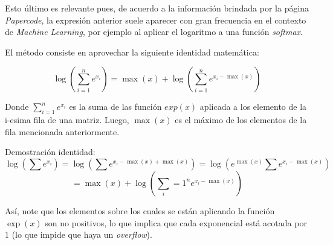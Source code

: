 \documentclass[12pt, letterpaper]{article}
\begin{document}
Esto último es relevante pues, de acuerdo a la información brindada por la página \textit{Papercode}, la expresión anterior
suele aparecer con gran frecuencia en el contexto de \textit{Machine Learning}, por ejemplo al aplicar el logaritmo a una función \textit{softmax}. 

El método consiste en aprovechar la siguiente identidad matemática: 

$$\log\left( \sum_{i=1}^n e^{x_i} \right) = \max(x) + \log\left( \sum_{i=1}^n e^{x_i-\max(x)} \right)$$

Donde $\sum_{i=1}^n e^{x_i}$ es la suma de las función $exp(x)$ aplicada a los elemento de la i-esima fila de una matriz. Luego, $\max(x)$ es el máximo de los elementos de la fila mencionada anteriormente.

Demostración identidad:
\[
\log\left( \sum e^{x_i} \right)=\log\left( \sum e^{x_i-\max(x)+\max(x)} \right)=\log\left( e^{\max(x)} \sum e^{x_i-\max(x)} \right)
\]
\[
=\max(x) + \log\left( \sum_i=1^n e^{x_i-\max(x)} \right)
\]

Así, note que los elementos sobre los cuales se están aplicando la función $\exp(x)$ son no positivos, lo que implica que cada exponencial está acotada por 1 (lo que impide que haya un \textit{overflow}).


    
\end{document}
